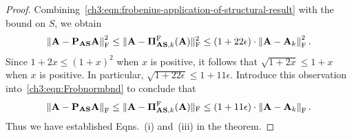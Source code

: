 \begin{proof}
Combining~\eqref{ch3:eqn:frobenius-application-of-structural-result} with the
bound on $S$, we obtain
\begin{equation}
\label{ch3:eqn:Frobnormbnd}
\left\|\mathbf{A} - \mathbf{P}_{\mathbf{A}\mathbf{S}} \mathbf{A} \right\|_\mathrm{F}^2  \le 
 \|\mathbf{A} - \boldsymbol{\Pi}_{\mathbf{A}\mathbf{S},k}^{\mathrm{F}}(\mathbf{A}) \|_{\mathrm{F}}^2 \le 
 \left( 1 +  22 \epsilon \right) \cdot \left\|\mathbf{A}-\mathbf{A}_k\right\|_\mathrm{F}^2.
\end{equation}
Since $1 + 2x \leq (1 + x)^2$ when $x$ is positive, it follows that
$\sqrt{1 + 2x} \leq 1 + x$ when $x$ is positive. In particular, 
$\sqrt{1 +  22 \epsilon} \le 1 +  11 \epsilon.$ Introduce this
observation into~\eqref{ch3:eqn:Frobnormbnd} to conclude that 
\[
\left\|\mathbf{A} - \mathbf{P}_{\mathbf{A}\mathbf{S}} \mathbf{A} \right\|_\mathrm{F} \le 
\|\mathbf{A} - \boldsymbol{\Pi}_{\mathbf{A}\mathbf{S},k}^{\mathrm{F}}(\mathbf{A})\|_{\mathrm{F}}
 \le (1 + 11 \epsilon) \cdot 
 \left\|\mathbf{A}-\mathbf{A}_k\right\|_\mathrm{F}.
\]
Thus we have established Eqns.~(i) and~(iii) in the theorem.


\end{proof}
